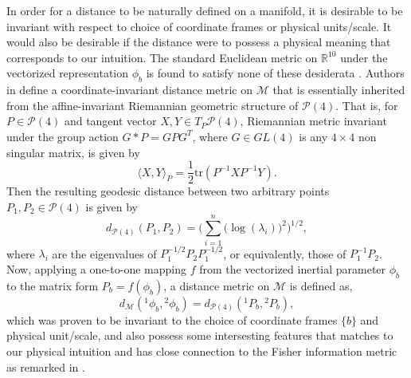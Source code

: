 \documentclass[letterpaper, 10 pt, conference]{ieeeconf}  %
\begin{document}
In order for a distance to be naturally defined on a manifold, it is desirable to be invariant with respect to choice of coordinate frames or physical units/scale. It would also be desirable if the distance were to possess a physical meaning that corresponds to our intuition. The standard Euclidean metric on $\mathbb{R}^{10}$ under the vectorized representation $\phi_{b}$ is found to satisfy none of these desiderata \cite{Taeyoon_RAL}. Authors in \cite{Taeyoon_RAL} define a coordinate-invariant distance metric on $\mathcal{M}$ that is essentially inherited from the affine-invariant Riemannian geometric structure of $\mathcal{P}(4)$. That is, for $P \in \mathcal{P}(4)$ and tangent vector $X, Y \in T_{P}\mathcal{P}(4)$, Riemannian metric invariant under the group action $G * P = GPG^T$, where $G\in GL(4)$ is any $4\times 4$ non singular matrix, is given by
\begin{equation}
\langle X,Y \rangle_{P} = \frac{1}{2}\mathrm{tr}(P^{-1}XP^{-1}Y).
\label{riem_metric_Pn}
\end{equation}
Then the resulting geodesic distance between two arbitrary points $P_1, P_2 \in \mathcal{P}(4)$ is given by 
\begin{equation*}
d_{\mathcal{P}(4)}(P_1,P_2) = \bigg(\sum_{i=1}^{n}\big(\log(\lambda_{i})\big)^2\bigg)^{1/2},
\nonumber
\end{equation*}
where $\lambda_i$ are the eigenvalues of $P_{1}^{-1/2}P_{2}P_{1}^{-1/2}$,
or equivalently, those of $P_{1}^{-1}P_{2}$. Now, applying a one-to-one mapping $f$ from the vectorized inertial parameter $\phi_b$ to the matrix form $P_{b} = f(\phi_b)$, a distance metric on $\mathcal{M}$ is defined as,
\begin{equation}
d_{\mathcal{M}}({^{1}}\phi_{b}, {^{2}}\phi_{b})=d_{\mathcal{P}(4)}({^{1}}P_{b}, {^{2}}P_{b}),
\label{metric_singlebody}
\end{equation}
which was proven to be invariant to the choice of coordinate frames $\{b\}$ and physical unit/scale, and also possess some intersesting features that matches to our physical intuition and has close connection to the Fisher information metric as remarked in \cite{Taeyoon_RAL}.
\end{document}
